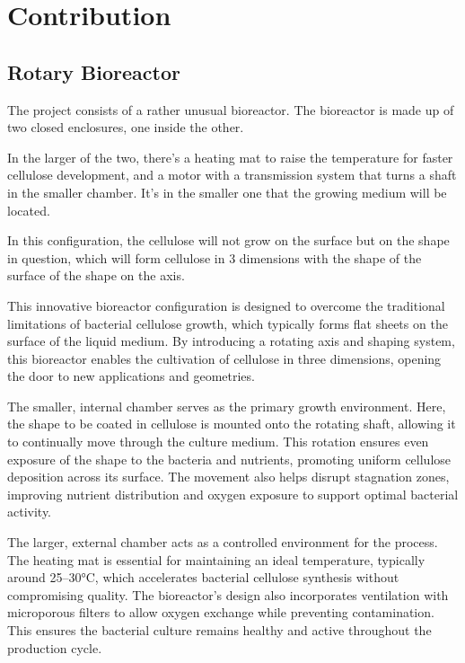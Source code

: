 \section{Contribution}

\subsection{Rotary Bioreactor}
The project consists of a rather unusual bioreactor. The bioreactor is made up of two closed enclosures, one inside the other.

In the larger of the two, there's a heating mat to raise the temperature for faster cellulose development, and a motor with a transmission system that turns a shaft in the smaller chamber. It's in the smaller one that the growing medium will be located.

In this configuration, the cellulose will not grow on the surface but on the shape in question, which will form cellulose in 3 dimensions with the shape of the surface of the shape on the axis. 

This innovative bioreactor configuration is designed to overcome the traditional limitations of bacterial cellulose growth, which typically forms flat sheets on the surface of the liquid medium. By introducing a rotating axis and shaping system, this bioreactor enables the cultivation of cellulose in three dimensions, opening the door to new applications and geometries.

The smaller, internal chamber serves as the primary growth environment. Here, the shape to be coated in cellulose is mounted onto the rotating shaft, allowing it to continually move through the culture medium. This rotation ensures even exposure of the shape to the bacteria and nutrients, promoting uniform cellulose deposition across its surface. The movement also helps disrupt stagnation zones, improving nutrient distribution and oxygen exposure to support optimal bacterial activity.

The larger, external chamber acts as a controlled environment for the process. The heating mat is essential for maintaining an ideal temperature, typically around 25–30°C, which accelerates bacterial cellulose synthesis without compromising quality. The bioreactor's design also incorporates ventilation with microporous filters to allow oxygen exchange while preventing contamination. This ensures the bacterial culture remains healthy and active throughout the production cycle.

